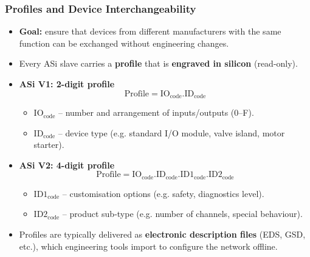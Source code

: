 \begin{frame}
	\frametitle{Profiles and Device Interchangeability}
	\begin{itemize}
		\item \textbf{Goal:} ensure that devices from different manufacturers with the same function
			can be exchanged without engineering changes.
		\item Every ASi slave carries a \textbf{profile} that is \textbf{engraved in silicon} (read-only).
		\item \textbf{ASi V1: 2-digit profile}
		\begin{equation}
			\text{Profile} = \text{IO}_{\text{code}} . \text{ID}_{\text{code}}
		\end{equation}
		\begin{itemize}
			\item $\text{IO}_{\text{code}}$ – number and arrangement of inputs/outputs (0--F).
			\item $\text{ID}_{\text{code}}$ – device type (e.g. standard I/O module, valve island, motor starter).
		\end{itemize}
		\item \textbf{ASi V2: 4-digit profile}
		\begin{equation}
			\text{Profile} = \text{IO}_{\text{code}} . \text{ID}_{\text{code}} . \text{ID1}_{\text{code}} . \text{ID2}_{\text{code}}
		\end{equation}
		\begin{itemize}
			\item $\text{ID1}_{\text{code}}$ – customisation options (e.g. safety, diagnostics level).
			\item $\text{ID2}_{\text{code}}$ – product sub-type (e.g. number of channels, special behaviour).
		\end{itemize}
		\item Profiles are typically delivered as \textbf{electronic description files}
			(EDS, GSD, etc.), which engineering tools import to configure the network offline.
	\end{itemize}
\end{frame}

